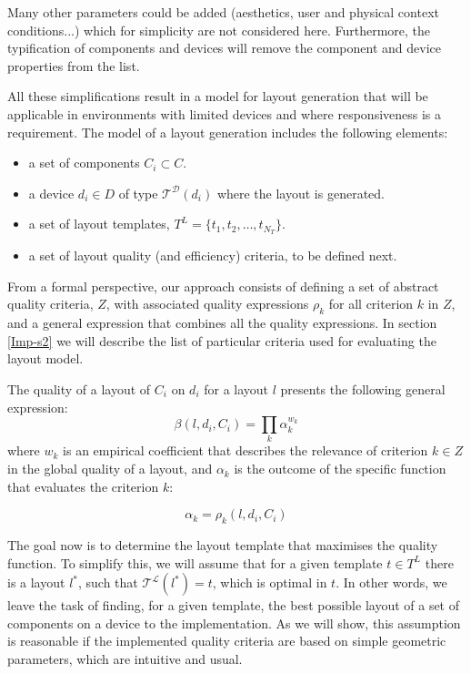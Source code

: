 Many other parameters could be added (aesthetics, user and physical context conditions...) which for simplicity are not considered here.  
Furthermore, the typification of components and devices will remove the component and device properties from the list. 

All these simplifications result in a model for layout generation that will be applicable in environments with limited devices and where responsiveness is a requirement.
The model of a layout generation includes the following elements:

\begin{itemize}
	\item a set of components $C_i \subset C$. 
	\item a device $d_i \in D$ of type $\mathcal{T^D}(d_i)$ where the layout is generated.
	\item a set of layout templates, $T^L=\{t_1, t_2, \ldots, t_{N_T}\}$.
	\item a set of layout quality (and efficiency) criteria, to be defined next.
\end{itemize}

From a formal perspective, our approach consists of defining a set of abstract quality criteria, $Z$, with associated quality expressions $\rho_k$ for all criterion $k$ in $Z$, and a general expression that combines all the quality expressions.
In section \ref{Imp-s2} we will describe the list of particular criteria used for evaluating the layout model.

The quality of a layout of $C_i$ on $d_i$ for a layout $l$ presents the following general expression:
\begin{equation} \label{Eq:layoutq}
\beta(l,d_i,C_i) = \prod_{k} \alpha_{k}^{w_k}
\end{equation}
where $w_k$ is an empirical coefficient that describes the relevance of criterion $k\in Z$ in the global quality of a layout, and $\alpha_k$ is the outcome of the specific function that evaluates the criterion $k$: 

\begin{equation}
\alpha_{k} = \rho_k (l,d_i,C_i) 
\end{equation}

The goal now is to determine the layout template that maximises the quality function. 
To simplify this, we will assume that for a given template $t \in T^L$ there is a layout $l^*$, such that $\mathcal{T^L}(l^*)=t$, which is optimal in $t$. 
In other words, we leave the task of finding, for a given template, the best possible layout of a set of components on a device to the implementation.
As we will show, this assumption is reasonable if the implemented quality criteria are based on simple geometric parameters, which are intuitive and usual.

